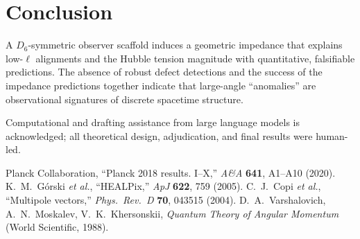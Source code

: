 \documentclass[reprint,aps,prl,twocolumn,nofootinbib,longbibliography]{revtex4-2}
\begin{document}
\begin{table*}[t]
\centering
\caption{WPC search outcomes (pre-impedance pivot). Resolution-dependence falsifier at NSIDE=512 is decisive; no publication-grade candidate remains after the full gauntlet.}
\label{tab:wpc}
\setlength{\tabcolsep}{3.5pt}
\end{table*}

\section{Conclusion}
A $D_6$-symmetric observer scaffold induces a geometric impedance that explains low-$\ell$ alignments and the Hubble tension magnitude with quantitative, falsifiable predictions. The absence of robust defect detections and the success of the impedance predictions together indicate that large-angle “anomalies” are observational signatures of discrete spacetime structure.

\begin{acknowledgments}
Computational and drafting assistance from large language models is acknowledged; all theoretical design, adjudication, and final results were human-led.
\end{acknowledgments}


\begin{thebibliography}{99}
 Planck Collaboration, ``Planck 2018 results. I--X,'' \emph{A\&A} \textbf{641}, A1--A10 (2020).
 K.~M.~G\'orski \emph{et al.}, ``HEALPix,'' \emph{ApJ} \textbf{622}, 759 (2005).
 C.~J.~Copi \emph{et al.}, ``Multipole vectors,'' \emph{Phys.\ Rev.\ D} \textbf{70}, 043515 (2004).
 D.~A.~Varshalovich, A.~N.~Moskalev, V.~K.~Khersonskii, \emph{Quantum Theory of Angular Momentum} (World Scientific, 1988).
\end{thebibliography}
\end{document}
